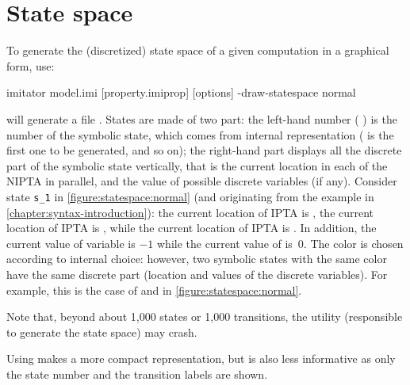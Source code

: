 \section{State space}

To generate the (discretized) state space of a given computation in a graphical form, use:

\begin{terminal}
imitator model.imi [property.imiprop] [options] -draw-statespace normal
\end{terminal}

\imitator{} will generate a file .
States are made of two part: the left-hand number (\eg{} ) is the number of the symbolic state, which comes from \imitator{} internal representation ( is the first one to be generated, and so on); the right-hand part displays all the discrete part of the symbolic state vertically, that is the current location in each of the NIPTA in parallel, and the value of possible discrete variables (if any).
Consider state \texttt{s\_1} in \cref{figure:statespace:normal} (and originating from the example in \cref{chapter:syntax-introduction}):
the current location of IPTA  is ,
the current location of IPTA  is ,
while
the current location of IPTA  is .
In addition, the current value of variable  is $-1$ while the current value of  is~0.
The color is chosen according to \imitator{} internal choice: however, two symbolic states with the same color have the same discrete part (location and values of the discrete variables).
For example, this is the case of  and  in \cref{figure:statespace:normal}.

Note that, beyond about 1,000 states or 1,000 transitions, the \gdot{} utility (responsible to generate the state space) may crash.

Using  makes a more compact representation, but is also less informative as only the state number and the transition labels are shown.

